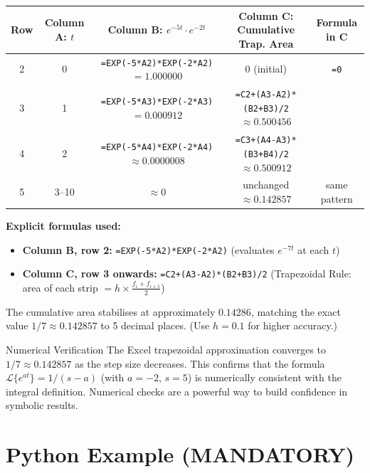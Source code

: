 \documentclass[12pt,a4paper]{article}
\begin{document}
\begin{center}
\begin{tabular}{@{}ccccc@{}}
\toprule
\textbf{Row} & \textbf{Column A: $t$} & \textbf{Column B: $e^{-5t} \cdot e^{-2t}$} & \textbf{Column C: Cumulative Trap. Area} & \textbf{Formula in C} \\
\midrule
2 & 0   & \texttt{=EXP(-5*A2)*EXP(-2*A2)} $= 1.000000$ & 0 (initial) & \texttt{=0} \\
3 & 1   & \texttt{=EXP(-5*A3)*EXP(-2*A3)} $= 0.000912$ & \texttt{=C2+(A3-A2)*(B2+B3)/2} $\approx 0.500456$ \\
4 & 2   & \texttt{=EXP(-5*A4)*EXP(-2*A4)} $\approx 0.0000008$ & \texttt{=C3+(A4-A3)*(B3+B4)/2} $\approx 0.500912$ \\
5 & 3--10 & $\approx 0$ & unchanged $\approx 0.142857$ & same pattern \\
\bottomrule
\end{tabular}
\end{center}

\medskip

\noindent \textbf{Explicit formulas used:}
\begin{itemize}[leftmargin=1.5em]
  \item \textbf{Column B, row 2:} \texttt{=EXP(-5*A2)*EXP(-2*A2)} \quad (evaluates $e^{-7t}$ at each $t$)
  \item \textbf{Column C, row 3 onwards:} \texttt{=C2+(A3-A2)*(B2+B3)/2} \quad (Trapezoidal Rule: area of each strip $= h \times \frac{f_i + f_{i+1}}{2}$)
\end{itemize}

The cumulative area stabilises at approximately $0.14286$, matching the exact value $1/7 \approx 0.142857$ to 5 decimal places. (Use $h = 0.1$ for higher accuracy.)

\begin{learnbox}{Numerical Verification}
The Excel trapezoidal approximation converges to $1/7 \approx 0.142857$ as the step size decreases. This confirms that the formula $\mathcal{L}\{e^{at}\} = 1/(s-a)$ (with $a = -2$, $s = 5$) is numerically consistent with the integral definition. Numerical checks are a powerful way to build confidence in symbolic results.
\end{learnbox}

\section{Python Example (MANDATORY)}
\end{document}

